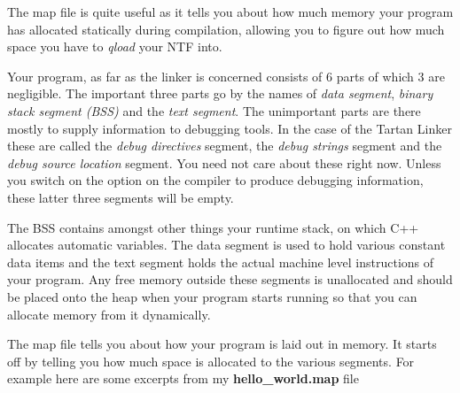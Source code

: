 The map file is quite useful as it tells you about how much memory 
your program has allocated statically during compilation, allowing you
to figure out how much space you have to {\em qload} your NTF into. 

Your program, as far as the linker is concerned consists of 6 parts 
of which 3 are negligible. The important three parts go by the names of
{\em data segment}, {\em binary stack segment (BSS)} and the {\em text segment}.
The unimportant parts are there mostly to supply information to debugging tools.
In the case of the Tartan Linker these are called the {\em debug directives} 
segment, the {\em debug strings} segment and the {\em debug source location}
segment. You need not care about these right now. Unless you switch on the
option on the compiler to produce debugging information, these latter three
segments will be empty.

The BSS contains amongst other things your runtime stack, on 
which C++ allocates automatic variables. The data segment is used
to hold various constant data items and the text segment holds the
actual machine level instructions of your program. Any free memory outside
these segments is unallocated and should be placed onto the heap when your
program starts running so that you can allocate memory from it dynamically.

The map file tells you about how your program is laid out in memory.
It starts off by telling you how much space is allocated to the various
segments. For example here are some excerpts from my {\bf hello\_world.map}
file

